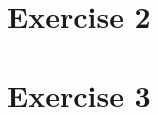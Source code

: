 \documentclass[10pt, titlepage, oneside, a4paper]{article}
\newcommand{\Section}[1]{\section{#1}\vspace{-8pt}}
\newcounter{appendixpage}
\newenvironment{appendices}{
	\setcounter{appendixpage}{\arabic{page}}
	\stepcounter{appendixpage}
}{
}
\newcommand{\appitem}[2]{
	\stepcounter{section}
	\addtocontents{toc}{\protect\contentsline{section}{\numberline{\Alph{section}}#1}{\arabic{appendixpage}}}
	\addtocounter{appendixpage}{#2}
}
\newcommand{\appsubitem}[2]{
	\stepcounter{subsection}
	\addtocontents{toc}{\protect\contentsline{subsection}{\numberline{\Alph{section}.\arabic{subsection}}#1}{\arabic{appendixpage}}}
	\addtocounter{appendixpage}{#2}
}
\begin{document}
	\FloatBarrier
	\Section{Exercise 2}
			

	\FloatBarrier
	\Section{Exercise 3}
	
	
	\FloatBarrier

%
%
\end{document}
